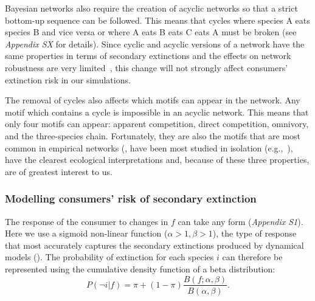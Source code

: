 \documentclass[12pt]{article}
\begin{document}
\begin{spacing}{2.0}
        
        Bayesian networks also require the creation of acyclic networks so that a strict bottom-up sequence can be followed. 
        This means that cycles where species A eats species B and vice versa or where A eats B eats C eats A must be broken (see \emph{Appendix SX} for details).
        Since cyclic and acyclic versions of a network have the same properties in terms of secondary extinctions and the effects on network robustness are very limited~\citep{Allesina2009functional}, this change will not strongly affect consumers' extinction risk in our simulations.

        
        The removal of cycles also affects which motifs can appear in the network. 
        Any motif which contains a cycle is impossible in an acyclic network.
        This means that only four motifs can appear: apparent competition, direct competition, omnivory, and the three-species chain.
        Fortunately, they are also the motifs that are most common in empirical networks (\citealp[]{Stouffer2007}, have been most studied in isolation (e.g.,~\citep{Hastings1991,Holt1987,Bascompte2005,Polis1989,Zabalo2012,Lefevre2009,Holt1997,Kondoh2008,McKinnon2013,Laws2013}), have the clearest ecological interpretations and, because of these three properties, are of greatest interest to us.


        \subsubsection*{Modelling consumers' risk of secondary extinction}
        
        The response of the consumer to changes in $f$ can take any form (\emph{Appendix S1}). Here we use a sigmoid non-linear function ($\alpha > 1, \beta > 1$), the type of response that most accurately captures the secondary extinctions produced by dynamical models (\citealp[]{Eklof2013}).
		The probability of extinction for each species $i$ can therefore be represented using the cumulative density function of a beta distribution:
		\begin{equation}
		P(\lnot i|f) = \pi + (1 - \pi) \frac{B(f;\alpha,\beta)}{B(\alpha,\beta)}.
				\label{betafunc}
        \end{equation}
		

\end{spacing}
\end{document}
